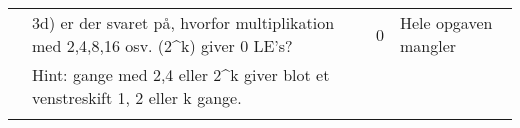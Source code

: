 \begin{table}[h]
\begin{tabularx}{\textwidth}{p{3.5cm}Xp{5mm}X}
                                              & 3d) er der svaret på, hvorfor multiplikation med 2,4,8,16 osv. (2\textasciicircum{}k) giver 0 LE’s? & 0 & Hele opgaven mangler                                                                           \\
                                              & Hint: gange med 2,4 eller 2\textasciicircum{}k giver blot et venstreskift 1, 2 eller k gange.       &   &                                                                                                         \\
                                              &                                                                                                     &   &                                                                                                         \\\midrule
    \end{tabularx}
\end{table}
